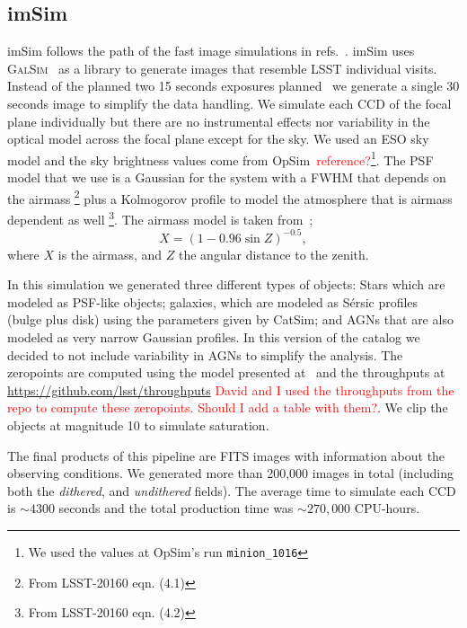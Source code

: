 \documentclass[\docopts]{\docclass}
\begin{document}
\subsection{imSim}
\label{sec:imsim_pipeline}

imSim follows the path of the fast image simulations in refs.~\citep{2016MNRAS.457..786S,2016ApJ...817...25B}.
imSim uses \textsc{GalSim}~\citep{2015A&C....10..121R} as a library to generate images that resemble LSST individual visits. Instead of the
planned two 15 seconds exposures planned~\citep{2008arXiv0805.2366I} we generate a single 30 seconds image to simplify the data handling.
We simulate each CCD of the focal plane individually but there are no instrumental effects nor variability in the optical model
across the focal plane except for the sky. We used an ESO sky model and the sky brightness values come from
OpSim~\textcolor{red}{reference?}\footnote{We used the values at OpSim's run \texttt{minion\_1016}}. The PSF model that we use is a Gaussian for the system with a FWHM that depends on the airmass
\footnote{From LSST-20160 eqn. (4.1)} plus a Kolmogorov profile to model the atmosphere that is airmass dependent as well
\footnote{From LSST-20160 eqn. (4.2)}. The airmass model is taken from~\citep{1991PASP..103.1033K};
\begin{equation}
X = (1 - 0.96\sin{Z})^{-0.5},
\end{equation}
where $X$ is the airmass, and $Z$ the angular distance to the zenith.

In this simulation we generated three different types of objects: Stars which are modeled as PSF-like objects; galaxies, which are modeled as S\'{e}rsic profiles~\citep{1963BAAA....6...41S} (bulge plus disk) using
the parameters given by CatSim; and AGNs that are also modeled as very narrow Gaussian profiles. In this version of the catalog we decided
to not include variability in AGNs to simplify the analysis. The zeropoints are computed using the model presented at~\citep{2008arXiv0805.2366I} and the
throughputs at \url{https://github.com/lsst/throughputs} \textcolor{red}{David and I used the throughputs from the repo to compute these zeropoints. Should I add a table with them?}. We clip the objects at magnitude 10 to simulate saturation.

The final products of this pipeline are FITS images with information about the observing conditions. We generated more than 200,000 images in total (including both the \textit{dithered}, and \textit{undithered} fields). The average time to simulate each CCD is $\sim 4300$ seconds and the total production time was $\sim 270,000$ CPU-hours.
\end{document}
